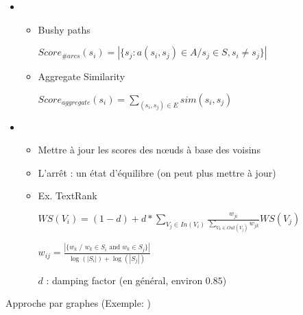 \documentclass{KodeBook}
\begin{document}
\begin{itemize}
	\item {}
	\begin{itemize}
		\item Bushy paths 
		
		\hspace{.5cm}$Score_{\#arcs}(s_i) = |\{ s_j : a(s_i, s_j) \in A / s_j \in S, s_i \neq s_j \}|$
		
		\item Aggregate Similarity
		
		\hspace{.5cm}$Score_{aggregate}(s_i) = \sum\limits_{(s_i, s_j) \in E} sim(s_i, s_j)$
	\end{itemize}
	\item {}
	\begin{itemize}
		\item Mettre à jour les scores des nœuds à base des voisins 
		\item L'arrêt : un état d'équilibre (on peut plus mettre à jour)
		\item Ex. TextRank \cite{04-mihalcea-tarau}
		
		$WS(V_i) = ( 1 - d) + d * \sum\limits_{V_j \in In(V_i)} \frac{w_{ji}}{\sum\limits_{V_k \in Out(V_j)} w_{jk}} WS(V_j)$
		
		$w_{ij} = \frac{|\{w_k \text{ / } w_k \in S_i \text{ and } w_k \in S_j\}|}{\log(|S_i|) + \log(|S_j|)}$
		
		$ d $ : damping factor (en général, environ $ 0.85 $)
	\end{itemize}
\end{itemize}

Approche par graphes (Exemple: \cite{21-aries-al})

\begin{center}
\end{center}
\end{document}
